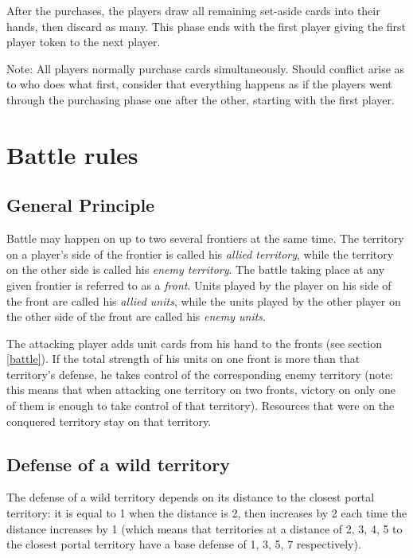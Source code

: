 \documentclass[a4paper]{article}
\begin{document}
        After the purchases, the players draw all remaining set-aside cards into their
        hands, then discard as many.        
        This phase ends with the first player giving the first player token
        to the next player.
        
        Note: All players normally purchase cards simultaneously.
        Should conflict arise as to who does what first,
        consider that everything happens as if the players went through
        the purchasing phase one after the other, starting with the first player.


\newpage
\section{Battle rules}
    \label{battle-rules}
    
    \subsection{General Principle}
        Battle may happen on up to two several frontiers at the same time.
        The territory on a player's side of the frontier is called his \textit{allied territory},
        while the territory on the other side is called his \textit{enemy territory}.
        The battle taking place at any given frontier is referred to as a \textit{front}.
        Units played by the player on his side of the front are called his
        \textit{allied units}, while the units played by the other player on the other
        side of the front are called his \textit{enemy units}.
        
        The attacking player adds unit cards from his hand to the fronts
        (see section \ref{battle}).
        If the total strength of his units on one front is more than that territory's
        defense, he takes control of the corresponding enemy territory
        (note: this means that when attacking one territory on two fronts,
        victory on only one of them is enough to take control of that territory).
        Resources that were on the conquered territory stay on that territory.
        
    \subsection{Defense of a wild territory}
        The defense of a wild territory depends on its distance
        to the closest portal territory:
        it is equal to 1 when the distance is 2,
        then increases by 2 each time the distance increases by 1
        (which means that territories at a distance of 2, 3, 4, 5
        to the closest portal territory have a base defense of  1, 3, 5, 7
        respectively).
        
\end{document}
